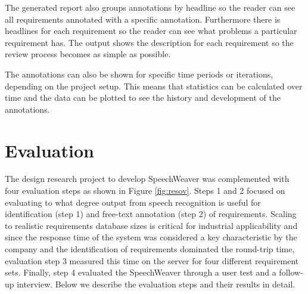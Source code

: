 \documentclass[conference]{IEEEtran}
\begin{document}


The generated report also groups annotations by headline so the reader can see all requirements annotated with a specific annotation. 
Furthermore there is headlines for each requirement so the reader can see what problems a particular requirement has. 
The output shows the description for each requirement so the review process becomes as simple as possible. 

The annotations can also be shown for specific time periods or iterations, depending on the project setup. 
This means that statistics can be calculated over time and the data can be plotted to see the history and development of the annotations.


\section{Evaluation}
\label{sec:eval}
The design research project to develop SpeechWeaver was complemented with four evaluation steps as shown in Figure \ref{fig:resov}.
Steps 1 and 2 focused on evaluating to what degree output from speech recognition is useful for identification (step 1) and free-text annotation (step 2) of requirements.
Scaling to realistic requirements database sizes is critical for industrial applicability and since the response time of the system was considered a key characteristic by the company and the identification of requirements dominated the round-trip time, evaluation step 3 measured this time on the server for four different requirement sets.
Finally, step 4 evaluated the SpeechWeaver through a user test and a follow-up interview.
Below we describe the evaluation steps and their results in detail.
\end{document}
